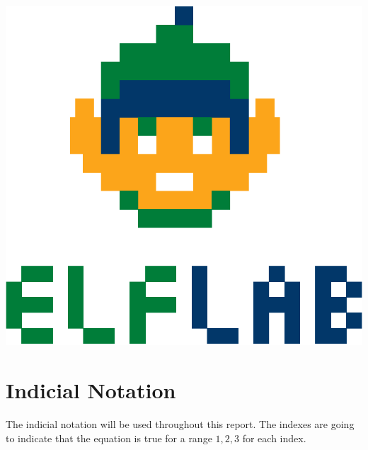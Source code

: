 \documentclass[11pt, a4paper]{article}
\numberwithin{equation}{section}
\begin{document}
\begin{titlepage}
\vspace*{\fill}
 \begin{center}
 	\includegraphics[scale=.3]{fig/logo7.eps}
    \end{center}
\vspace*{\fill}
\end{titlepage}



\thispagestyle{empty}


\clearpage
\thispagestyle{empty}
\tableofcontents


\clearpage
\pagestyle{fancy}





\section{Indicial Notation}

The indicial notation will be used throughout this report. The indexes are going to indicate that the equation is true for a range ${1,2,3}$ for each index.
\end{document}
